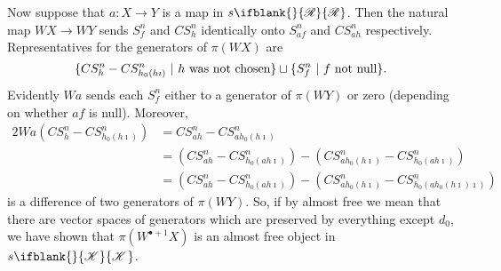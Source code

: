 \documentclass[10pt]{article}
\newcommand{\PRLie}[1]%
{\ifblank{#1}{\scrR}{\scrR^{#1}}}
\newcommand{\LL}[1]{\ifblank{#1}{\scrK}{\scrK^{#1}}}
\begin{document}
\begin{backgroundOnMultiplicativity}
Now suppose that $a:X\to Y$ is a map in $s\PRLie{}$. Then the natural map $WX\to WY$ sends $S^n_f$ and $CS^n_h$ identically onto $S^n_{af}$ and $CS^n_{ah}$ respectively. Representatives for the generators of $\pi(WX)$ are 
\[\{CS^n_h-CS^n_{h_0(h\imath)}\ |\ \textup{$h$ was not chosen}\}\sqcup\{S^n_f\ |\ \textup{$f$ not null}\}.\]
Evidently $Wa$ sends each $S^n_f$ either to a generator of $\pi(WY)$ or zero (depending on whether $af$ is null). Moreover,
\begin{alignat*}{2}
Wa(CS^n_h-CS^n_{h_0(h\imath)})
&=
CS^n_{ah}-CS^n_{ah_0(h\imath)}%
\\
&=
\left(CS^n_{ah}-CS^n_{h_0(ah\imath)}\right)-\left(CS^n_{ah_0(h\imath)}-CS^n_{h_0(ah\imath)}\right)%
\\
&=
\left(CS^n_{ah}-CS^n_{h_0(ah\imath)}\right)-\left(CS^n_{ah_0(h\imath)}-CS^n_{h_0(ah_0(h\imath)\imath)}\right)%
\end{alignat*}
is a difference of two generators of $\pi(WY)$. So, if by almost free we mean that there are vector spaces of generators which are preserved by everything except $d_0$, we have shown that $\pi(W^{\bullet+1}X)$ is an almost free object in $s\LL{}$.

\end{backgroundOnMultiplicativity}
\end{document}
